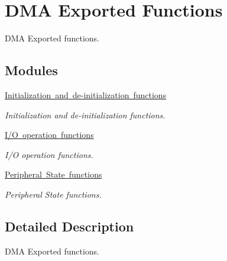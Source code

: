 \hypertarget{group___d_m_a___exported___functions}{}\section{D\+MA Exported Functions}
\label{group___d_m_a___exported___functions}


D\+MA Exported functions.  


\subsection*{Modules}
\begin{DoxyCompactItemize}
\item 
\mbox{\hyperlink{group___d_m_a___exported___functions___group1}{Initialization and de-\/initialization functions}}
\begin{DoxyCompactList}\small\item\em Initialization and de-\/initialization functions. \end{DoxyCompactList}\item 
\mbox{\hyperlink{group___d_m_a___exported___functions___group2}{I/\+O operation functions}}
\begin{DoxyCompactList}\small\item\em I/O operation functions. \end{DoxyCompactList}\item 
\mbox{\hyperlink{group___d_m_a___exported___functions___group3}{Peripheral State functions}}
\begin{DoxyCompactList}\small\item\em Peripheral State functions. \end{DoxyCompactList}\end{DoxyCompactItemize}


\subsection{Detailed Description}
D\+MA Exported functions. 

